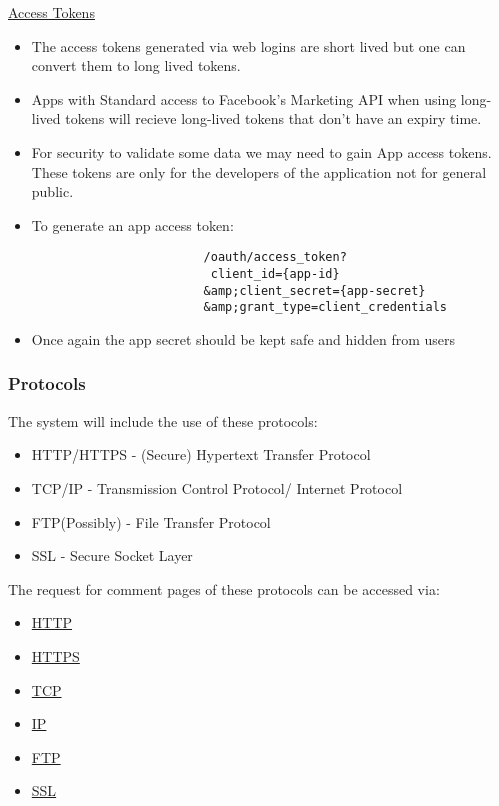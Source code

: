 \documentclass{article}
\begin{document}
			\href{https://developers.facebook.com/docs/facebook-login/access-tokens}{Access Tokens}
			\begin{itemize}
				\item The access tokens generated via web logins are short lived but one can convert them to long lived tokens.
				\item Apps with Standard access to Facebook's Marketing API when using long-lived tokens will recieve long-lived tokens that don't have an expiry time.
				\item For security to validate some data we may need to gain App access tokens. These tokens are only for the developers of the application not for general public.
				\item To generate an app access token:
					\begin{verbatim}
						/oauth/access_token?
					     client_id={app-id}
					    &amp;client_secret={app-secret}
					    &amp;grant_type=client_credentials
					\end{verbatim}
				\item Once again the app secret should be kept safe and hidden from users
			\end{itemize}

		\subsubsection{Protocols}
		The system will include the use of these protocols:
		\begin{itemize}
			\item HTTP/HTTPS - (Secure) Hypertext Transfer Protocol
			\item TCP/IP - Transmission Control Protocol/ Internet Protocol
			\item FTP(Possibly) - File Transfer Protocol
			\item SSL - Secure Socket Layer 
		\end{itemize}
		The request for comment pages of these protocols can be accessed via:
		\begin{itemize}
			\item\href{https://tools.ietf.org/html/rfc2616}{HTTP}
			\item\href{https://tools.ietf.org/html/rfc2660}{HTTPS}
			\item\href{https://www.ietf.org/rfc/rfc793.txt}{TCP}
			\item\href{http://www.ietf.org/rfc/rfc0791.txt}{IP}
			\item\href{https://www.ietf.org/rfc/rfc959.txt}{FTP}
			\item\href{https://tools.ietf.org/html/rfc6101}{SSL}
		\end{itemize}
\end{document}
